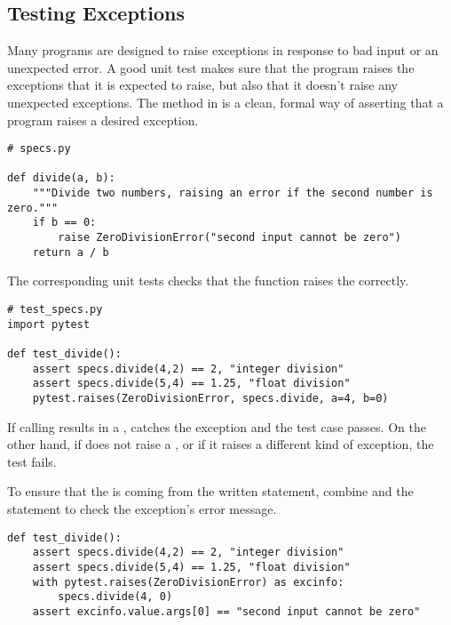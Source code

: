 \subsection*{Testing Exceptions} %

Many programs are designed to raise exceptions in response to bad input or an unexpected error.
A good unit test makes sure that the program raises the exceptions that it is expected to raise, but also that it doesn't raise any unexpected exceptions.
The  method in  is a clean, formal way of asserting that a program raises a desired exception.

\begin{lstlisting}
# specs.py

def divide(a, b):
    """Divide two numbers, raising an error if the second number is zero."""
    if b == 0:
        raise ZeroDivisionError("second input cannot be zero")
    return a / b
\end{lstlisting}

The corresponding unit tests checks that the function raises the  correctly.

\begin{lstlisting}
# test_specs.py
import pytest

def test_divide():
    assert specs.divide(4,2) == 2, "integer division"
    assert specs.divide(5,4) == 1.25, "float division"
    pytest.raises(ZeroDivisionError, specs.divide, a=4, b=0)
\end{lstlisting}

If calling  results in a ,  catches the exception and the test case passes.
On the other hand, if  does not raise a , or if it raises a different kind of exception, the test fails.

To ensure that the  is coming from the written  statement, combine  and the  statement to check the exception's error message.

\begin{lstlisting}
def test_divide():
    assert specs.divide(4,2) == 2, "integer division"
    assert specs.divide(5,4) == 1.25, "float division"
    with pytest.raises(ZeroDivisionError) as excinfo:
        specs.divide(4, 0)
    assert excinfo.value.args[0] == "second input cannot be zero"
\end{lstlisting}

